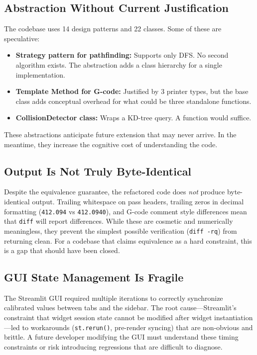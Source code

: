 \documentclass[11pt,a4paper]{article}
\begin{document}
\subsection{Abstraction Without Current Justification}

The codebase uses 14 design patterns and 22 classes. Some of these are speculative:

\begin{itemize}[leftmargin=2em]
    \item \textbf{Strategy pattern for pathfinding:} Supports only DFS. No second algorithm exists. The abstraction adds a class hierarchy for a single implementation.
    \item \textbf{Template Method for G-code:} Justified by 3 printer types, but the base class adds conceptual overhead for what could be three standalone functions.
    \item \textbf{CollisionDetector class:} Wraps a KD-tree query. A function would suffice.
\end{itemize}

These abstractions anticipate future extension that may never arrive. In the meantime, they increase the cognitive cost of understanding the code.

\subsection{Output Is Not Truly Byte-Identical}

Despite the equivalence guarantee, the refactored code does \emph{not} produce byte-identical output. Trailing whitespace on pass headers, trailing zeros in decimal formatting (\texttt{412.094} vs \texttt{412.0940}), and G-code comment style differences mean that \texttt{diff} will report differences. While these are cosmetic and numerically meaningless, they prevent the simplest possible verification (\texttt{diff -rq}) from returning clean. For a codebase that claims equivalence as a hard constraint, this is a gap that should have been closed.

\subsection{GUI State Management Is Fragile}

The Streamlit GUI required multiple iterations to correctly synchronize calibrated values between tabs and the sidebar. The root cause---Streamlit's constraint that widget session state cannot be modified after widget instantiation---led to workarounds (\texttt{st.rerun()}, pre-render syncing) that are non-obvious and brittle. A future developer modifying the GUI must understand these timing constraints or risk introducing regressions that are difficult to diagnose.
\end{document}
